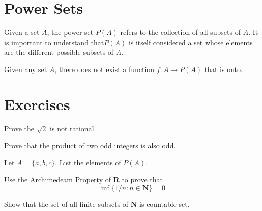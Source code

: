 \section{Power Sets}
Given a set $ A $, the power set $ P(A) $ refers to the collection of all subsets of $ A $. It
is important to understand that$  P (A) $ is itself considered a set whose elements are the different possible subsets of $ A $.
\begin{theorem}
	Given any set $ A $, there does not exist a function $ f:A \rightarrow P(A) $ that is onto. 
\end{theorem}
\section{Exercises}
\begin{q}
	Prove the $ \sqrt{2}$ is not rational.
\end{q}
\begin{q}
	Prove that the product of two odd integers is also odd.
\end{q}
\begin{q}
	Let $ A = \{ a , b , c \} $. List the elements of $ P(A) $.
\end{q}
\begin{q}
	Use the Archimedeam Property of \textbf{R} to prove that
	\[ \inf \{ 1 / n : n \in \mathbf { N } \} = 0 \]
\end{q}
\begin{q}
	Show that the set of all finite subsets of \textbf{N} is countable set.
\end{q}


































